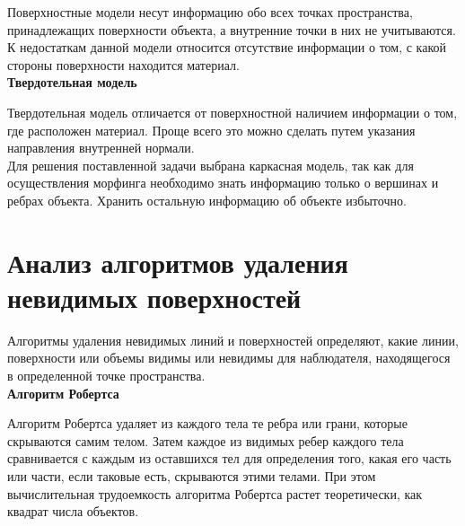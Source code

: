 Поверхностные модели несут информацию обо всех точках
пространства, принадлежащих поверхности объекта, а внутренние точки в них
не учитываются. К недостаткам данной модели относится отсутствие информации о том, с какой стороны поверхности находится материал.\\ %

\textbf{Твердотельная модель} %

Твердотельная модель отличается от поверхностной наличием информации о том, где расположен материал. Проще всего это можно сделать путем указания направления внутренней нормали.~\cite{Kosnikov}\\


Для решения поставленной задачи выбрана каркасная модель, так как для осуществления морфинга необходимо знать информацию только о вершинах и ребрах объекта. Хранить остальную информацию об объекте избыточно. 


\section{Анализ алгоритмов удаления невидимых поверхностей}

Алгоритмы удаления невидимых линий и поверхностей определяют, какие линии, поверхности или объемы видимы или невидимы для наблюдателя, находящегося в определенной точке пространства.\\

\textbf{Алгоритм Робертса} %

Алгоритм Робертса удаляет из каждого тела те ребра или грани, которые скрываются самим телом. Затем каждое из видимых ребер каждого тела сравнивается с каждым из оставшихся тел для определения того, какая его часть или части, если таковые есть, скрываются этими телами. При этом вычислительная трудоемкость алгоритма Робертса растет теоретически, как квадрат числа объектов.\\ %


